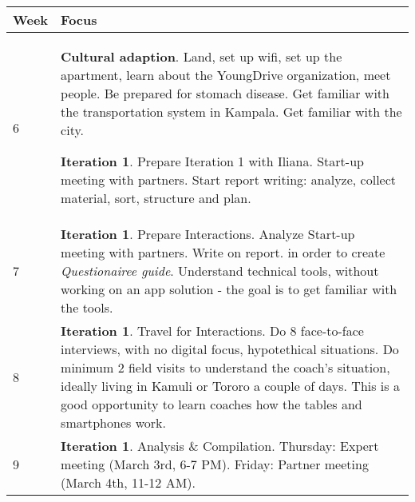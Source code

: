 \begin{center}
    \begin{tabular}{ | l | p{10cm} |}
    \hline
    Week & Focus \\ \hline
    6 & \textbf{Cultural adaption}. Land, set up wifi, set up the apartment, learn about the YoungDrive organization, meet people. Be prepared for stomach disease. Get familiar with the transportation system in Kampala. Get familiar with the city.

    \textbf{Iteration 1}. Prepare Iteration 1 with Iliana. %
    Start-up meeting with partners. %
    Start report writing: analyze, collect material, sort, structure and plan.
    \\ \hline
    7 & \textbf{Iteration 1}. Prepare Interactions. Analyze Start-up meeting with partners. Write on report. %
    in order to create \textit{Questionairee guide}. Understand technical tools, without working on an app solution - the goal is to get familiar with the tools. %
    \\ \hline
    8 & \textbf{Iteration 1}. Travel for Interactions. Do 8 face-to-face interviews, with no digital focus, hypotethical situations. Do minimum 2 field visits to understand the coach's situation, ideally living in Kamuli or Tororo a couple of days. This is a good opportunity to learn coaches how the tables and smartphones work.  \\ \hline %

    9 & \textbf{Iteration 1}. Analysis \& Compilation. Thursday: Expert meeting (March 3rd, 6-7 PM). Friday: Partner meeting (March 4th, 11-12 AM).


\end{tabular}
\end{center}
